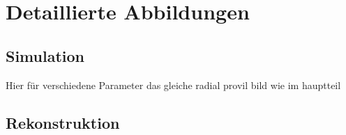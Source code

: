 \chapter{Detaillierte Abbildungen}
\section{Simulation}
Hier für verschiedene Parameter das gleiche radial provil bild wie im hauptteil

\section{Rekonstruktion}
\nocite{*}